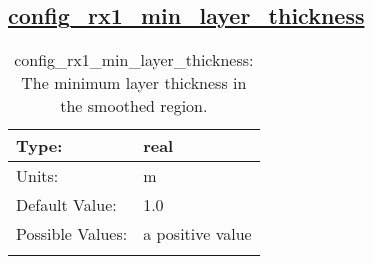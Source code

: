\subsection[config\_rx1\_min\_layer\_thickness]{\hyperref[sec:nm_tab_constrain_Haney_number]{config\_rx1\_min\_layer\_thickness}}
\label{subsec:nm_sec_config_rx1_min_layer_thickness}
\begin{center}
\begin{longtable}{| p{2.0in} || p{4.0in} |}
    \hline
    Type: & real \\
    \hline
    Units: & \si{m} \\
    \hline
    Default Value: & 1.0 \\
    \hline
    Possible Values: & a positive value \\
    \hline
    \caption{config\_rx1\_min\_layer\_thickness: The minimum layer thickness in the smoothed region.}
\end{longtable}
\end{center}
